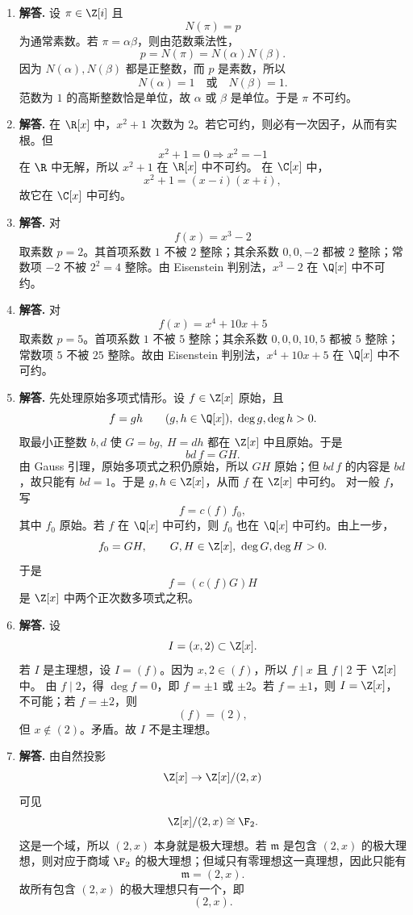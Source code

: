 \begin{enumerate}[label=\textbf{\arabic*.}, leftmargin=*, itemsep=1em]
  \item \textbf{解答.} 设 $\pi\in\Z[i]$ 且
  \[
  N(\pi)=p
  \]
  为通常素数。若 $\pi=\alpha\beta$，则由范数乘法性，
  \[
  p=N(\pi)=N(\alpha)N(\beta).
  \]
  因为 $N(\alpha),N(\beta)$ 都是正整数，而 $p$ 是素数，所以
  \[
  N(\alpha)=1\quad\text{或}\quad N(\beta)=1.
  \]
  范数为 $1$ 的高斯整数恰是单位，故 $\alpha$ 或 $\beta$ 是单位。于是 $\pi$ 不可约。

  \item \textbf{解答.} 在 $\R[x]$ 中，$x^2+1$ 次数为 $2$。若它可约，则必有一次因子，从而有实根。但
  \[
  x^2+1=0 \Longrightarrow x^2=-1
  \]
  在 $\R$ 中无解，所以 $x^2+1$ 在 $\R[x]$ 中不可约。  
  在 $\C[x]$ 中，
  \[
  x^2+1=(x-i)(x+i),
  \]
  故它在 $\C[x]$ 中可约。

  \item \textbf{解答.} 对
  \[
  f(x)=x^3-2
  \]
  取素数 $p=2$。其首项系数 $1$ 不被 $2$ 整除；其余系数 $0,0,-2$ 都被 $2$ 整除；常数项 $-2$ 不被 $2^2=4$ 整除。由 Eisenstein 判别法，$x^3-2$ 在 $\Q[x]$ 中不可约。

  \item \textbf{解答.} 对
  \[
  f(x)=x^4+10x+5
  \]
  取素数 $p=5$。首项系数 $1$ 不被 $5$ 整除；其余系数 $0,0,0,10,5$ 都被 $5$ 整除；常数项 $5$ 不被 $25$ 整除。故由 Eisenstein 判别法，$x^4+10x+5$ 在 $\Q[x]$ 中不可约。

  \item \textbf{解答.} 先处理原始多项式情形。设 $f\in\Z[x]$ 原始，且
  \[
  f=gh\qquad (g,h\in\Q[x]),\ \deg g,\deg h>0.
  \]
  取最小正整数 $b,d$ 使 $G=bg,\ H=dh$ 都在 $\Z[x]$ 中且原始。于是
  \[
  bd\,f=GH.
  \]
  由 Gauss 引理，原始多项式之积仍原始，所以 $GH$ 原始；但 $bd\,f$ 的内容是 $bd$，故只能有 $bd=1$。于是 $g,h\in\Z[x]$，从而 $f$ 在 $\Z[x]$ 中可约。  
  对一般 $f$，写
  \[
  f=c(f)\,f_0,
  \]
  其中 $f_0$ 原始。若 $f$ 在 $\Q[x]$ 中可约，则 $f_0$ 也在 $\Q[x]$ 中可约。由上一步，
  \[
  f_0=GH,\qquad G,H\in\Z[x],\ \deg G,\deg H>0.
  \]
  于是
  \[
  f=(c(f)G)H
  \]
  是 $\Z[x]$ 中两个正次数多项式之积。

  \item \textbf{解答.} 设
  \[
  I=(x,2)\subset \Z[x].
  \]
  若 $I$ 是主理想，设 $I=(f)$。因为 $x,2\in(f)$，所以 $f\mid x$ 且 $f\mid2$ 于 $\Z[x]$ 中。  
  由 $f\mid2$，得 $\deg f=0$，即 $f=\pm1$ 或 $\pm2$。若 $f=\pm1$，则 $I=\Z[x]$，不可能；若 $f=\pm2$，则
  \[
  (f)=(2),
  \]
  但 $x\notin(2)$。矛盾。故 $I$ 不是主理想。

  \item \textbf{解答.} 由自然投影
  \[
  \Z[x]\to \Z[x]/(2,x)
  \]
  可见
  \[
  \Z[x]/(2,x)\cong \F_2.
  \]
  这是一个域，所以 $(2,x)$ 本身就是极大理想。若 $\mathfrak m$ 是包含 $(2,x)$ 的极大理想，则对应于商域 $\F_2$ 的极大理想；但域只有零理想这一真理想，因此只能有
  \[
  \mathfrak m=(2,x).
  \]
  故所有包含 $(2,x)$ 的极大理想只有一个，即
  \[
  (2,x).
  \]


\end{enumerate}
